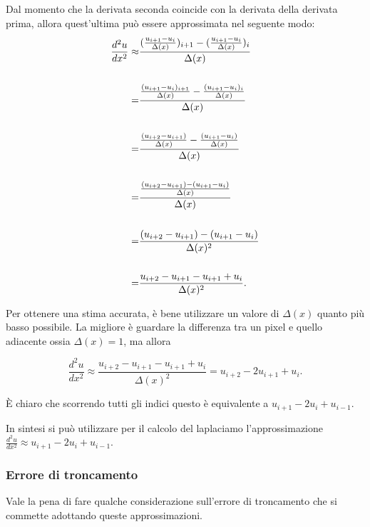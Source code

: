 \vspace{1em}
\raggedright
Dal momento che la derivata seconda coincide con la derivata della derivata prima, allora quest'ultima può essere approssimata nel seguente modo:\\
\centering    
{\large
\begin{align*}
\frac{d^2u}{dx^2} \approx &
\frac{
(\frac{u_{i+1} - u_i}{\Delta(x)})_{i+1} 
- 
(\frac{u_{i+1} - u_i}{\Delta(x)})_i
}{\Delta(x)}
\\
\vline
\\
= &
\frac{
\frac{(u_{i+1} - u_i)_{i+1}}{\Delta(x)} 
-   
\frac{(u_{i+1} - u_i)_i}{\Delta(x)}
}{\Delta(x)}
\\
\vline 
\\
= &
\frac{
\frac{(u_{i+2} - u_{i+1})}{\Delta(x)} 
- 
\frac{(u_{i+1} - u_i)}{\Delta(x)}
}{\Delta(x)}
\\
\vline 
\\
= &
\frac{
\frac{(u_{i+2} - u_{i+1}) 
- 
(u_{i+1} - u_i)}{\Delta(x)}
}{\Delta(x)}
\\
\vline
\\
= &
\frac{
(u_{i+2} - u_{i+1}) 
- 
(u_{i+1} - u_i)}
{\Delta(x)^2}
\\
\vline 
\\
= &
\frac{
 u_{i+2} - u_{i+1} 
-u_{i+1} + {u_i}}
{\Delta(x)^2}
.\\
\end{align*}
}
\raggedright
Per ottenere una stima accurata, è bene utilizzare un valore di $\Delta(x)$ quanto più basso possibile. La migliore è guardare la differenza tra un pixel e quello adiacente ossia $\Delta(x)=1$, ma allora 

$$\frac{d^2u}{dx^2} \approx
\frac{
 u_{i+2} - u_{i+1} 
-u_{i+1} + u_i}
{\Delta(x)^2} = u_{i+2} -2 u_{i+1} + u_i.$$

\`E chiaro che scorrendo tutti gli indici questo è equivalente a $u_{i+1} -2 u_i + u_{i-1}.$

In sintesi si può utilizzare per il calcolo del laplaciamo l'approssimazione \\
\vspace{2pt}
\centering 
$\frac{d^2u}{dx^2} \approx u_{i+1} -2 u_i + u_{i-1}$.\\
\raggedright
\newpage
\subsubsection{Errore di troncamento}

Vale la pena di fare qualche considerazione sull'errore di troncamento che si commette adottando queste approssimazioni.\\

